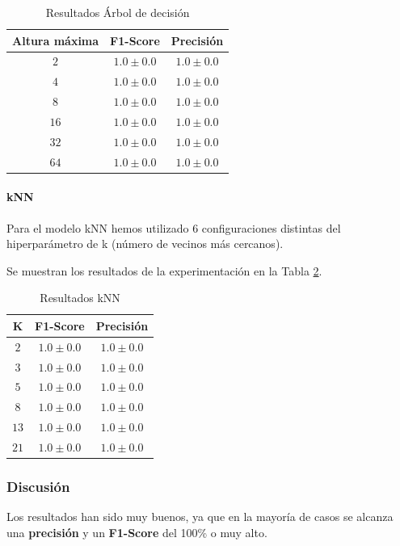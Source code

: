 \documentclass[12pt]{article}
\begin{document}
\begin{table}[!ht]
	\caption{Resultados Árbol de decisión}
	\centering
		 \begin{tabular}{||c c c||}
			 \hline
			 Altura máxima & F1-Score & Precisión  \\ [0.5ex]
			 \hline\hline
			 $2$ & $1.0 \pm 0.0$ & $1.0 \pm 0.0$ \\
			 \hline
			 $4$ & $1.0 \pm 0.0$ & $1.0 \pm 0.0$ \\
			 \hline
			 $8$ & $1.0 \pm 0.0$ & $1.0 \pm 0.0$ \\
			 \hline
			 $16$ & $1.0 \pm 0.0$ & $1.0 \pm 0.0$ \\
			 \hline
			 $32$ & $1.0 \pm 0.0$ & $1.0 \pm 0.0$ \\
			 \hline
			 $64$ & $1.0 \pm 0.0$ & $1.0 \pm 0.0$ \\
			 \hline
		 \end{tabular}
	\label{Tab:DecisionTree_1}
\end{table}

\paragraph{kNN}
Para el modelo kNN hemos utilizado 6 configuraciones distintas del hiperparámetro de k (número de vecinos más cercanos).

Se muestran los resultados de la experimentación en la Tabla \ref{Tab:kNN_1}.

\begin{table}[!ht]
	\caption{Resultados kNN}
	\centering
		\begin{tabular}{||c c c||}
			\hline
			K & F1-Score & Precisión  \\ [0.5ex]
			\hline\hline
			$2$ & $1.0 \pm 0.0$ & $1.0 \pm 0.0$ \\
			\hline
			$3$ & $1.0 \pm 0.0$ & $1.0 \pm 0.0$ \\
			\hline
			$5$ & $1.0 \pm 0.0$ & $1.0 \pm 0.0$ \\
			\hline
			$8$ & $1.0 \pm 0.0$ & $1.0 \pm 0.0$ \\
			\hline
			$13$ & $1.0 \pm 0.0$ & $1.0 \pm 0.0$ \\
			\hline
			$21$ & $1.0 \pm 0.0$ & $1.0 \pm 0.0$ \\
			\hline
		\end{tabular}
	\label{Tab:kNN_1}
\end{table}

\subsubsection{Discusión}
Los resultados han sido muy buenos, ya que en la mayoría de casos se alcanza una \textbf{precisión} y un \textbf{F1-Score} del 100\% o muy alto. 
\end{document}
